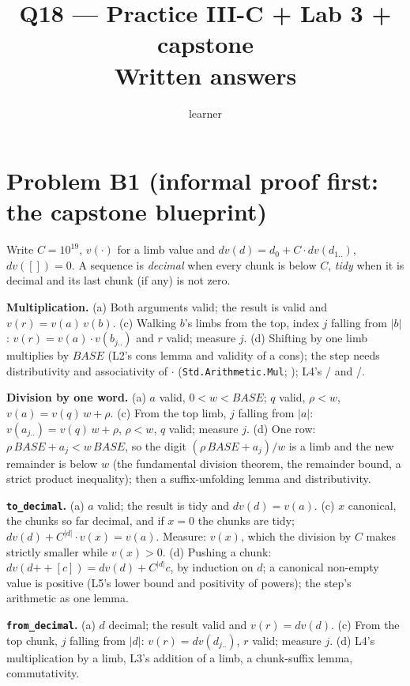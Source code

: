 \documentclass[11pt]{article}
\title{Q18 --- Practice III-C + Lab 3 + capstone \\ \large Written answers}
\author{learner}
\date{}
\begin{document}
\maketitle
\sloppy

\section*{Problem B1 (informal proof first: the capstone blueprint)}\label{ans:B1}
\begin{answer}
Write $C = 10^{19}$, $v(\cdot)$ for a limb value and
$\mathit{dv}(d) = d_0 + C\cdot\mathit{dv}(d_{1..})$, $\mathit{dv}([]) = 0$.
A sequence is \emph{decimal} when every chunk is below $C$, \emph{tidy} when
it is decimal and its last chunk (if any) is not zero.

\textbf{Multiplication.}
(a) Both arguments valid; the result is valid and $v(r) = v(a)\,v(b)$.
(c) Walking $b$'s limbs from the top, index $j$ falling from $|b|$:
$v(r) = v(a)\cdot v(b_{j..})$ and $r$ valid; measure $j$.
(d) Shifting by one limb multiplies by $\mathit{BASE}$ (L2's cons lemma and
validity of a cons); the step needs distributivity and associativity of
$\cdot$ (\texttt{Std.Arithmetic.Mul}; ); L4's
/ and /.

\textbf{Division by one word.}
(a) $a$ valid, $0 < w < \mathit{BASE}$; $q$ valid, $\rho < w$,
$v(a) = v(q)\,w + \rho$.
(c) From the top limb, $j$ falling from $|a|$: $v(a_{j..}) = v(q)\,w + \rho$,
$\rho < w$, $q$ valid; measure $j$.
(d) One row: $\rho\,\mathit{BASE} + a_j < w\,\mathit{BASE}$, so the digit
$(\rho\,\mathit{BASE}+a_j)/w$ is a limb and the new remainder is below $w$
(the fundamental division theorem, the remainder bound, a strict product
inequality); then a suffix-unfolding lemma and distributivity.

\textbf{\texttt{to\_decimal}.}
(a) $a$ valid; the result is tidy and $\mathit{dv}(d) = v(a)$.
(c) $x$ canonical, the chunks so far decimal, and if $x = 0$ the chunks are
tidy; $\mathit{dv}(d) + C^{|d|}\cdot v(x) = v(a)$. Measure: $v(x)$, which
the division by $C$ makes strictly smaller while $v(x) > 0$.
(d) Pushing a chunk: $\mathit{dv}(d \mathbin{+\!\!+} [c]) = \mathit{dv}(d) +
C^{|d|} c$, by induction on $d$; a canonical non-empty value is positive
(L5's lower bound and positivity of powers); the step's arithmetic as one
lemma.

\textbf{\texttt{from\_decimal}.}
(a) $d$ decimal; the result valid and $v(r) = \mathit{dv}(d)$.
(c) From the top chunk, $j$ falling from $|d|$: $v(r) = \mathit{dv}(d_{j..})$,
$r$ valid; measure $j$.
(d) L4's multiplication by a limb, L3's addition of a limb, a chunk-suffix
lemma, commutativity.


\end{answer}
\end{document}
